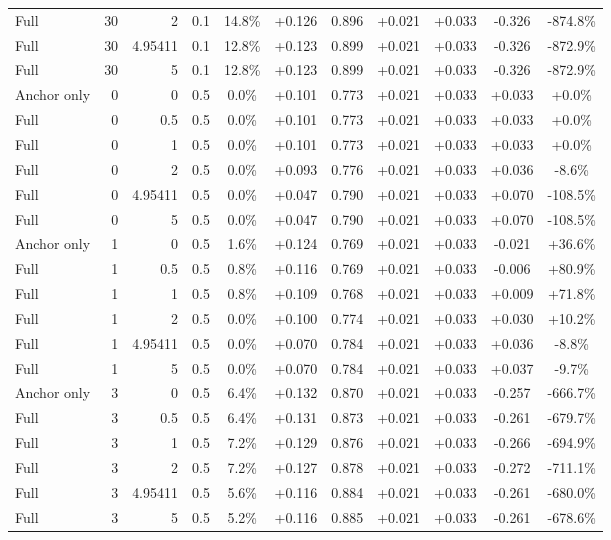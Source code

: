 \begin{table}[htbp]
\begin{tabular}{lrrrccccccc}
Full & 30 & 2 & 0.1 & 14.8\% & +0.126 & 0.896 & +0.021 & +0.033 & -0.326 & -874.8\% \\
Full & 30 & 4.95411 & 0.1 & 12.8\% & +0.123 & 0.899 & +0.021 & +0.033 & -0.326 & -872.9\% \\
Full & 30 & 5 & 0.1 & 12.8\% & +0.123 & 0.899 & +0.021 & +0.033 & -0.326 & -872.9\% \\
Anchor only & 0 & 0 & 0.5 & 0.0\% & +0.101 & 0.773 & +0.021 & +0.033 & +0.033 & +0.0\% \\
Full & 0 & 0.5 & 0.5 & 0.0\% & +0.101 & 0.773 & +0.021 & +0.033 & +0.033 & +0.0\% \\
Full & 0 & 1 & 0.5 & 0.0\% & +0.101 & 0.773 & +0.021 & +0.033 & +0.033 & +0.0\% \\
Full & 0 & 2 & 0.5 & 0.0\% & +0.093 & 0.776 & +0.021 & +0.033 & +0.036 & -8.6\% \\
Full & 0 & 4.95411 & 0.5 & 0.0\% & +0.047 & 0.790 & +0.021 & +0.033 & +0.070 & -108.5\% \\
Full & 0 & 5 & 0.5 & 0.0\% & +0.047 & 0.790 & +0.021 & +0.033 & +0.070 & -108.5\% \\
Anchor only & 1 & 0 & 0.5 & 1.6\% & +0.124 & 0.769 & +0.021 & +0.033 & -0.021 & +36.6\% \\
Full & 1 & 0.5 & 0.5 & 0.8\% & +0.116 & 0.769 & +0.021 & +0.033 & -0.006 & +80.9\% \\
Full & 1 & 1 & 0.5 & 0.8\% & +0.109 & 0.768 & +0.021 & +0.033 & +0.009 & +71.8\% \\
Full & 1 & 2 & 0.5 & 0.0\% & +0.100 & 0.774 & +0.021 & +0.033 & +0.030 & +10.2\% \\
Full & 1 & 4.95411 & 0.5 & 0.0\% & +0.070 & 0.784 & +0.021 & +0.033 & +0.036 & -8.8\% \\
Full & 1 & 5 & 0.5 & 0.0\% & +0.070 & 0.784 & +0.021 & +0.033 & +0.037 & -9.7\% \\
Anchor only & 3 & 0 & 0.5 & 6.4\% & +0.132 & 0.870 & +0.021 & +0.033 & -0.257 & -666.7\% \\
Full & 3 & 0.5 & 0.5 & 6.4\% & +0.131 & 0.873 & +0.021 & +0.033 & -0.261 & -679.7\% \\
Full & 3 & 1 & 0.5 & 7.2\% & +0.129 & 0.876 & +0.021 & +0.033 & -0.266 & -694.9\% \\
Full & 3 & 2 & 0.5 & 7.2\% & +0.127 & 0.878 & +0.021 & +0.033 & -0.272 & -711.1\% \\
Full & 3 & 4.95411 & 0.5 & 5.6\% & +0.116 & 0.884 & +0.021 & +0.033 & -0.261 & -680.0\% \\
Full & 3 & 5 & 0.5 & 5.2\% & +0.116 & 0.885 & +0.021 & +0.033 & -0.261 & -678.6\% \\

\end{tabular}
\end{table}
